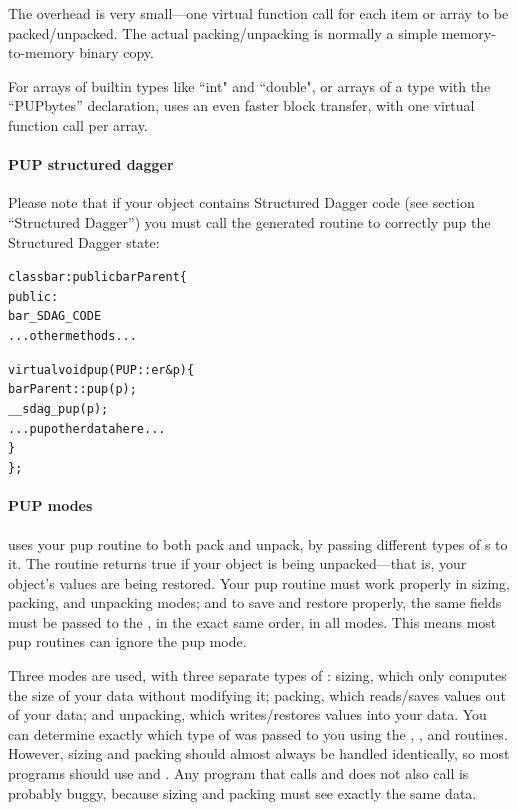 The  overhead is very small---one virtual function call
for each item or array to be packed/unpacked.  The actual packing/unpacking is
normally a simple memory-to-memory binary copy. 

For arrays of builtin types like ``int" and ``double", or arrays of a type 
with the ``PUPbytes'' declaration,  uses an even faster block 
transfer, with one virtual function call per array.


\paragraph{PUP structured dagger}
\label{sec:pupsdag}

Please note that if your object contains Structured Dagger code (see section ``Structured Dagger'') you must call the generated routine  to correctly pup the Structured Dagger state:

\begin{alltt}
class bar : public barParent \{
 public:
    bar_SDAG_CODE 
    ...other methods...

    virtual void pup(PUP::er& p) \{
      barParent::pup(p);
      __sdag_pup(p);
      ...pup other data here...
    \}
\};
\end{alltt}



\paragraph{PUP modes}
\label{sec:pupmodes}

\charmpp{} uses your pup routine to both pack and unpack, 
by passing different types of s to it.  The routine
 returns true if your object is being unpacked---that 
is, your object's values are being restored.  Your pup routine must
work properly in sizing, packing, and unpacking modes; and
to save and restore properly, the same fields must be passed 
to the , in the exact same order, in all modes.
This means most pup routines can ignore the pup mode.

Three modes are used, with three separate types of : 
sizing, which only computes the size of your data without modifying it;
packing, which reads/saves values out of your data; and unpacking,
which writes/restores values into your data.  You can determine
exactly which type of  was passed to you using the
, , and 
routines. However, sizing and packing should almost always be 
handled identically, so most programs should use 
and .  Any program that calls  
and does not also call  is probably buggy, because
sizing and packing must see exactly the same data.


